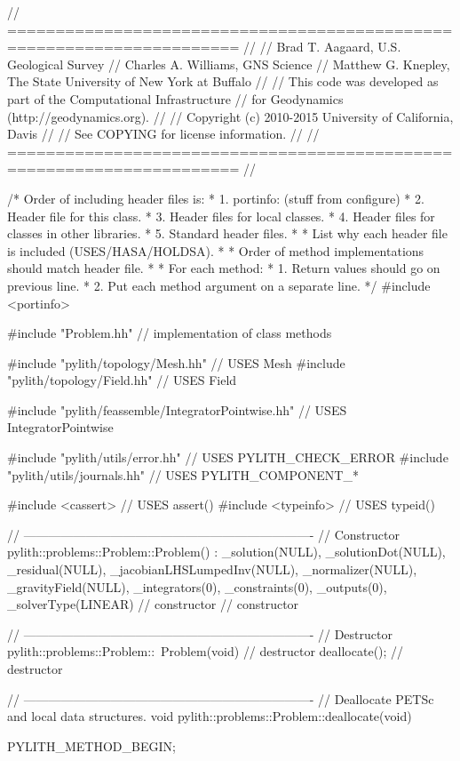 \begin{cplusplus}
// ======================================================================
//
// Brad T. Aagaard, U.S. Geological Survey
// Charles A. Williams, GNS Science
// Matthew G. Knepley, The State University of New York at Buffalo
//
// This code was developed as part of the Computational Infrastructure
// for Geodynamics (http://geodynamics.org).
//
// Copyright (c) 2010-2015 University of California, Davis
//
// See COPYING for license information.
//
// ======================================================================
//

/* Order of including header files is:
 * 1. portinfo: (stuff from configure)
 * 2. Header file for this class.
 * 3. Header files for local classes.
 * 4. Header files for classes in other libraries.
 * 5. Standard header files.
 *
 * List why each header file is included (USES/HASA/HOLDSA).
 *
 * Order of method implementations should match header file.
 *
 * For each method:
 *   1. Return values should go on previous line.
 *   2. Put each method argument on a separate line.
 */
#include <portinfo>

#include "Problem.hh" // implementation of class methods

#include "pylith/topology/Mesh.hh" // USES Mesh
#include "pylith/topology/Field.hh" // USES Field

#include "pylith/feassemble/IntegratorPointwise.hh" // USES IntegratorPointwise

#include "pylith/utils/error.hh" // USES PYLITH_CHECK_ERROR
#include "pylith/utils/journals.hh" // USES PYLITH_COMPONENT_*

#include <cassert> // USES assert()
#include <typeinfo> // USES typeid()

// ----------------------------------------------------------------------
// Constructor
pylith::problems::Problem::Problem() :
    _solution(NULL),
    _solutionDot(NULL),
    _residual(NULL),
    _jacobianLHSLumpedInv(NULL),
    _normalizer(NULL),
    _gravityField(NULL),
    _integrators(0),
    _constraints(0),
    _outputs(0),
    _solverType(LINEAR)
{ // constructor
} // constructor

// ----------------------------------------------------------------------
// Destructor
pylith::problems::Problem::~Problem(void)
{ // destructor
    deallocate();
} // destructor

// ----------------------------------------------------------------------
// Deallocate PETSc and local data structures.
void
pylith::problems::Problem::deallocate(void) {
    PYLITH_METHOD_BEGIN;

}
\end{cplusplus}
